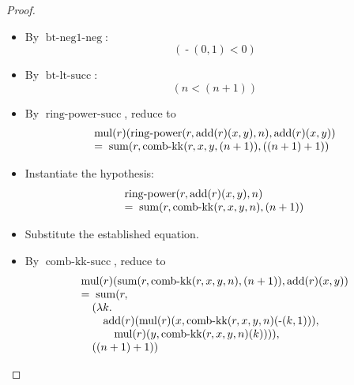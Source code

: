 \documentclass[11pt]{article}
\theoremstyle{plain}
\begin{document}
\begin{proof}
\begin{itemize}[leftmargin=2.8em, itemsep=4pt, parsep=1pt]
  \item[\textbf{28}] By $\operatorname{bt\text{-}neg1\text{-}neg}$:
\begin{equation*}
(\operatorname{\text{-}}(0, 1) < 0)
\end{equation*}

  \item[\textbf{29}] By $\operatorname{bt\text{-}lt\text{-}succ}$:
\begin{equation*}
(n < (n + 1))
\end{equation*}

  \item[\textbf{30}] By $\operatorname{ring\text{-}power\text{-}succ}$, reduce to
\begin{equation*}
\begin{array}{@{}l@{}} \operatorname{mul}(r)(\operatorname{ring\text{-}power}(r, \operatorname{add}(r)(x, y), n), \operatorname{add}(r)(x, y)) \\ =\; \operatorname{sum}(r, \operatorname{comb\text{-}kk}(r, x, y, (n + 1)), ((n + 1) + 1)) \end{array}
\end{equation*}

  \item[\textbf{31--33}] Instantiate the hypothesis:
\begin{equation*}
\begin{array}{@{}l@{}} \operatorname{ring\text{-}power}(r, \operatorname{add}(r)(x, y), n) \\ =\; \operatorname{sum}(r, \operatorname{comb\text{-}kk}(r, x, y, n), (n + 1)) \end{array}
\end{equation*}

  \item[\textbf{34}] Substitute the established equation.
  \item[\textbf{35}] By $\operatorname{comb\text{-}kk\text{-}succ}$, reduce to
\begin{equation*}
\begin{array}{@{}l@{}} \operatorname{mul}(r)(\operatorname{sum}(r, \operatorname{comb\text{-}kk}(r, x, y, n), (n + 1)), \operatorname{add}(r)(x, y)) \\ =\; \operatorname{sum}(r, \\ \quad (\lambda k.\; \\ \quad \quad \operatorname{add}(r)(\operatorname{mul}(r)(x, \operatorname{comb\text{-}kk}(r, x, y, n)(\operatorname{\text{-}}(k, 1))), \\ \quad \quad \quad \operatorname{mul}(r)(y, \operatorname{comb\text{-}kk}(r, x, y, n)(k)))), \\ \quad ((n + 1) + 1)) \end{array}
\end{equation*}


\end{itemize}
\end{proof}
\end{document}

